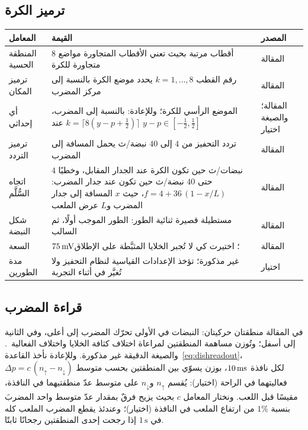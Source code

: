 \subsection*{ترميز الكرة}

\begin{center}
\footnotesize
\setlength{\tabcolsep}{4pt}
\renewcommand{\arraystretch}{1.15}
\begin{tabular}{>{\raggedright}p{3.4cm}>{\raggedright}p{7.5cm}>{\raggedright\arraybackslash}p{1.6cm}}
\toprule
المعامل & القيمة & المصدر \\
\midrule
المنطقة الحسية & $8$ أقطاب مرتبة بحيث تعني الأقطاب المتجاورة مواضع متجاورة للكرة & المقالة \\
ترميز المكان & رقم القطب $k=1,\dots,8$ يحدد موضع الكرة بالنسبة إلى مركز المضرب & المقالة \\
أي إحداثي & الموضع الرأسي للكرة؛ وللإعادة: بالنسبة إلى المضرب، $k=\lceil 8(y-p+\tfrac12)\rceil$ عند $y-p\in[-\tfrac12,\tfrac12]$ & المقالة؛ والصيغة اختيار \\
ترميز التردد & تردد التحفيز من $4$ إلى $40$ نبضة/ث يحمل المسافة إلى المضرب & المقالة \\
اتجاه السُّلَّم & $4$ نبضات/ث حين تكون الكرة عند الجدار المقابل، وخطيًا حتى $40$ نبضة/ث حين تكون عند جدار المضرب: $f=4+36\,(1-x/L)$، حيث $x$ المسافة إلى جدار المضرب و$L$ عرض الملعب & المقالة \\
شكل النبضة & مستطيلة قصيرة ثنائية الطور: الطور الموجب أولًا، ثم السالب & المقالة \\
السعة & $75\,\text{mV}$؛ اختيرت كي لا تُجبر الخلايا المثبَّطة على الإطلاق & المقالة \\
مدة الطورين & غير مذكورة؛ تؤخذ الإعدادات القياسية لنظام التحفيز ولا تُغيَّر في أثناء التجربة & اختيار \\
\bottomrule
\end{tabular}
\end{center}

\subsection*{قراءة المضرب}

في المقالة منطقتان حركيتان: النبضات في الأولى تحرّك المضرب إلى أعلى، وفي الثانية إلى أسفل؛ وتُوزن مساهمة المنطقتين لمراعاة اختلاف كثافة الخلايا واختلاف الفعالية~\cite{Kagan2022}. والصيغة الدقيقة غير مذكورة. وللإعادة نأخذ القاعدة~\eqref{eq:dishreadout}، $\Delta p=c\,(n_\uparrow-n_\downarrow)$ لكل نافذة $10\,\text{ms}$، بوزن يسوّي بين المنطقتين بحسب متوسط فعاليتهما في الراحة (اختيار): يُقسم $n_\uparrow$ و$n_\downarrow$ على متوسط عدّ منطقتيهما في النافذة، مقيسًا قبل اللعب. ونختار المعامل $c$ بحيث يزيح فرقٌ بمقدار عدّ متوسط واحد المضربَ بنسبة $1\%$ من ارتفاع الملعب في النافذة (اختيار)؛ وعندئذ يقطع المضرب الملعب كله في $1\,\text{s}$ إذا رجحت إحدى المنطقتين رجحانًا ثابتًا.

